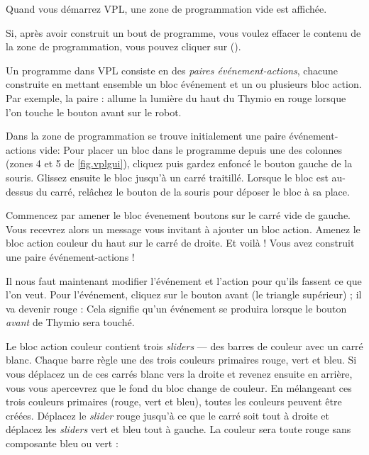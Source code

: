 \newpage


Quand vous démarrez VPL, une zone de programmation vide est affichée.

Si, après avoir construit un bout de programme, vous voulez effacer le contenu de la zone de programmation, vous pouvez cliquer sur  ().

Un programme dans VPL consiste en des \emph{paires événement-actions}, chacune construite en mettant ensemble un bloc événement et un ou plusieurs bloc action.
Par exemple, la paire :  allume la lumière du haut du Thymio en rouge lorsque l'on touche le bouton avant sur le robot.


Dans la zone de programmation se trouve initialement une paire événement-actions vide: 
Pour placer un bloc dans le programme depuis une des colonnes (zones 4 et 5 de \cref{fig.vplgui}), cliquez puis gardez enfoncé le bouton gauche de la souris.
Glissez ensuite le bloc jusqu'à un carré traitillé.
Lorsque le bloc est au-dessus du carré, relâchez le bouton de la souris pour déposer le bloc à sa place.


Commencez par amener le bloc évenement boutons  sur le carré vide de gauche.
Vous recevrez alors un message vous invitant à ajouter un bloc action.
Amenez le bloc action couleur du haut  sur le carré de droite.
Et voilà ! Vous avez construit une paire événement-actions !

Il nous faut maintenant modifier l'événement et l'action pour qu'ils fassent ce que l'on veut.
Pour l'événement, cliquez sur le bouton avant (le triangle supérieur) ; il va devenir rouge : 
Cela signifie qu'un événement se produira lorsque le bouton \emph{avant} de Thymio sera touché.

Le bloc action couleur contient trois \textit{sliders} --- des barres de couleur avec un carré blanc.
Chaque barre règle une des trois couleurs primaires rouge, vert et bleu.
Si vous déplacez un de ces carrés blanc vers la droite et revenez ensuite en arrière,
vous vous apercevrez que le fond du bloc change de couleur.
En mélangeant ces trois couleurs primaires (rouge, vert et bleu),
toutes les couleurs peuvent être créées.
Déplacez le \textit{slider} rouge jusqu'à ce que le carré soit
tout à droite et déplacez les \textit{sliders} vert et bleu tout à gauche.
La couleur sera toute rouge sans composante bleu ou vert : 

